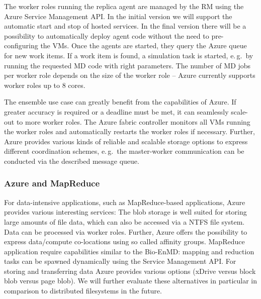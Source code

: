 \documentclass[3p,twocolumn]{elsarticle}
\begin{document}
The worker roles running the replica agent are managed by the RM using
the Azure Service Management API. In the initial version we will
support the automatic start and stop of hosted services. In the final
version there will be a possibility to automatically deploy agent code
without the need to pre-configuring the VMs. Once the agents are
started, they query the Azure queue for new work items. If a work item
is found, a simulation task is started, e.\,g.\ by running the requested
MD code with right parameters.  The number of
MD jobs per worker role depends on the size of the worker role --
Azure currently supports worker roles up to 8 cores.


The ensemble use case can greatly benefit from the
capabilities of Azure. If greater accuracy is required or a deadline
must be met, it can seamlessly scale-out to more worker roles.  The
Azure fabric controller monitors all VMs running the worker roles and
automatically restarts the worker roles if necessary. Further, Azure
provides various kinds of reliable and scalable storage options to
express different coordination schemes, e.\,g.\ the master-worker
communication can be conducted via the described message queue. 

\subsubsection{Azure and MapReduce}

For data-intensive applications, such as MapReduce-based applications,
Azure provides various interesting services: 
The blob storage is well suited for storing large amounts of file data, 
which can also be accessed via a NTFS file system. Data can be processed 
via worker roles. Further, Azure offers the possibility to express data/compute 
co-locations using so called affinity groups. MapReduce application require capabilities 
similar to the Bio-EnMD: mapping and reduction tasks can be spawned dynamically using the Service 
Management API. For storing and transferring data Azure provides various options
(xDrive versus block blob versus page blob). We will further evaluate these alternatives
in particular in comparison to distributed filesystems in the future. 


\end{document}
